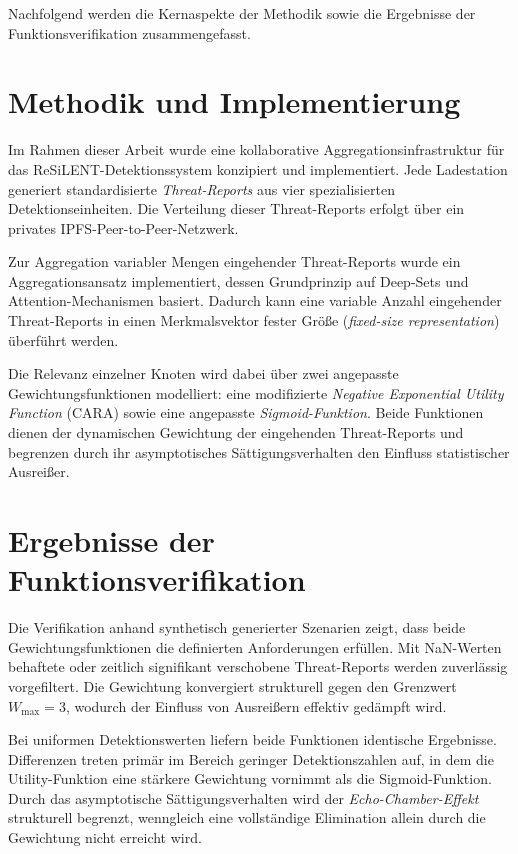 Nachfolgend werden die Kernaspekte der Methodik sowie die Ergebnisse der Funktionsverifikation zusammengefasst.

\section{Methodik und Implementierung}
Im Rahmen dieser Arbeit wurde eine kollaborative Aggregationsinfrastruktur für das ReSiLENT-Detektionssystem konzipiert und implementiert. Jede Ladestation generiert standardisierte \textit{Threat-Reports} aus vier spezialisierten Detektionseinheiten. Die Verteilung dieser Threat-Reports erfolgt über ein privates IPFS-Peer-to-Peer-Netzwerk.

Zur Aggregation variabler Mengen eingehender Threat-Reports wurde ein Aggregationsansatz implementiert, dessen Grundprinzip auf Deep-Sets und Attention-Mechanismen basiert. Dadurch kann eine variable Anzahl eingehender Threat-Reports in einen Merkmalsvektor fester Größe (\textit{fixed-size representation}) überführt werden.

Die Relevanz einzelner Knoten wird dabei über zwei angepasste Gewichtungsfunktionen modelliert: eine modifizierte \textit{Negative Exponential Utility Function} (CARA) sowie eine angepasste \textit{Sigmoid-Funktion}. Beide Funktionen dienen der dynamischen Gewichtung der eingehenden Threat-Reports und begrenzen durch ihr asymptotisches Sättigungsverhalten den Einfluss statistischer Ausreißer.

\section{Ergebnisse der Funktionsverifikation}
Die Verifikation anhand synthetisch generierter Szenarien zeigt, dass beide Gewichtungsfunktionen die definierten Anforderungen erfüllen. Mit NaN-Werten behaftete oder zeitlich signifikant verschobene Threat-Reports werden zuverlässig vorgefiltert. Die Gewichtung konvergiert strukturell gegen den Grenzwert $W_{\max}= 3$, wodurch der Einfluss von Ausreißern effektiv gedämpft wird.

Bei uniformen Detektionswerten liefern beide Funktionen identische Ergebnisse. Differenzen treten primär im Bereich geringer Detektionszahlen auf, in dem die Utility-Funktion eine stärkere Gewichtung vornimmt als die Sigmoid-Funktion. Durch das asymptotische Sättigungsverhalten wird der \textit{Echo-Chamber-Effekt} strukturell begrenzt, wenngleich eine vollständige Elimination allein durch die Gewichtung nicht erreicht wird.

